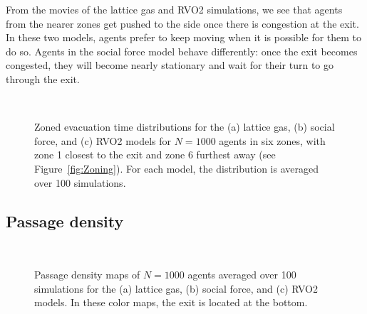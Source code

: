 From the movies of the lattice gas and RVO2 simulations, we see that agents from the nearer zones get pushed to the side once there is congestion at the exit. In these two models, agents prefer to keep moving when it is possible for them to do so. Agents in the social force model behave differently: once the exit becomes congested, they will become nearly stationary and wait for their turn to go through the exit.



\begin{figure}[htbp]
\centering
{}
\hspace{1cm}
\\
\caption{Zoned evacuation time distributions for the (a) lattice gas, (b) social force, and (c) RVO2 models for $N = 1000$ agents in six zones, with zone 1 closest to the exit and zone 6 furthest away (see Figure~\ref{fig:Zoning}). For each model, the distribution is averaged over 100 simulations.}
\label{fig:ZoningEvac}
\end{figure}



\subsection{Passage density}

\begin{figure}[htbp]
\centering
{}
\hspace{2cm}
\\
\caption{Passage density maps of $N = 1000$ agents averaged over 100 simulations for the (a) lattice gas, (b) social force, and (c) RVO2 models. In these color maps, the exit is located at the bottom.}
\label{fig:DensityMap}
\end{figure}


